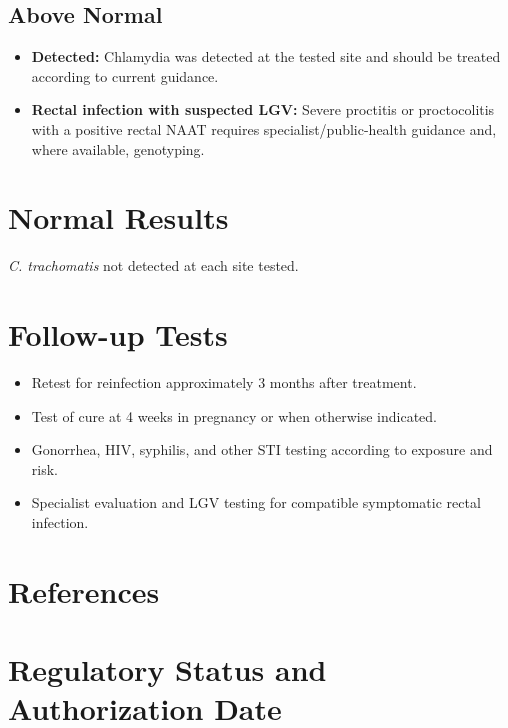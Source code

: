 \subsection*{Above Normal}
\begin{itemize}
  \item \textbf{Detected:} Chlamydia was detected at the tested site and should be treated according to current guidance.
  \item \textbf{Rectal infection with suspected LGV:} Severe proctitis or proctocolitis with a positive rectal NAAT requires specialist/public-health guidance and, where available, genotyping.
\end{itemize}

\section*{Normal Results}
\textit{C. trachomatis} not detected at each site tested.

\section*{Follow-up Tests}
\begin{itemize}
  \item Retest for reinfection approximately 3 months after treatment.
  \item Test of cure at 4 weeks in pregnancy or when otherwise indicated.
  \item Gonorrhea, HIV, syphilis, and other STI testing according to exposure and risk.
  \item Specialist evaluation and LGV testing for compatible symptomatic rectal infection.
\end{itemize}

\section*{References}


\clearpage
\section*{Regulatory Status and Authorization Date}

\clearpage

